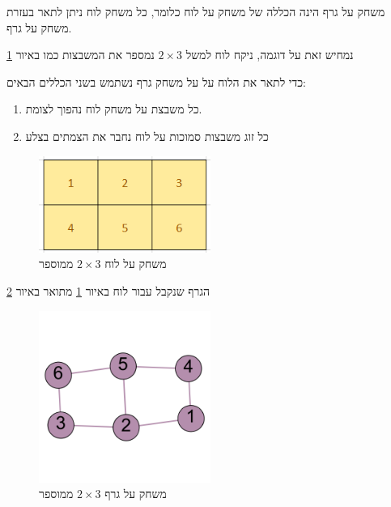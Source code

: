 \documentclass[12pt,twoside]{article}
\begin{document}
משחק על גרף הינה הכללה  של משחק על לוח כלומר, כל משחק 
לוח ניתן לתאר בעזרת משחק על גרף.

נמחיש זאת על דוגמה, ניקח לוח למשל
$2 \times 3$
נמספר את המשבצות כמו באיור
\ref{2x3_board}

כדי לתאר את הלוח על על משחק גרף נשתמש בשני הכללים הבאים:
\begin{enumerate}
    \item 
    כל משבצת על משחק לוח נהפוך לצומת.
    \item 
    כל זוג משבצות סמוכות על לוח נחבר את הצמתים בצלע
\end{enumerate}

\begin{figure}[ht]
    \caption{
        משחק על לוח
        $2 \times 3$
        ממוספר
    }
    \label{2x3_board}
    \centering
    \includegraphics[width=0.5\textwidth,height=0.5\textheight,keepaspectratio]{images/2x3_board.PNG}
\end{figure}

הגרף שנקבל עבור לוח באיור
\ref{2x3_board}
מתואר באיור
\ref{2x3_graph}

\begin{figure}[ht]
    \caption{
        משחק על גרף
        $2 \times 3$
        ממוספר
    }
    \centering
    \label{2x3_graph}
    \includegraphics[width=0.5\textwidth,height=0.5\textheight,keepaspectratio]{images/2x3_graph.png}
\end{figure}
\end{document}
